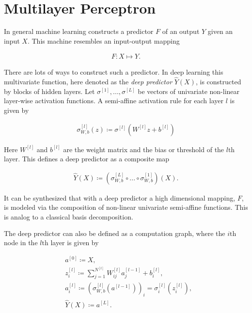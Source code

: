 \documentclass[12pt, a4paper]{thesis}
\begin{document}
\section{Multilayer Perceptron}
\label{sec:org1b5c208}

In general machine learning constructs a predictor \(F\) of an output
\(Y\) given an input \(X\). This machine resembles an input-output
mapping

\begin{align}
  F : X \mapsto Y.
\end{align}

There are lots of ways to construct such a predictor. In deep learning
this multivariate function, here denoted as the \emph{deep predictor}
\(\hat{Y}(X)\), is constructed by blocks of hidden layers. Let
\(\sigma^{[1]},...,\sigma^{[L]}\) be vectors of univariate non-linear
layer-wise activation functions. A semi-affine activation rule for
each layer $l$ is given by

\begin{align}
  \sigma^{[l]}_{W,b}(z) \coloneqq \sigma^{[l]}\left(W^{[l]} z + b^{[l]} \right)
\end{align}

Here \(W^{[l]}\) and \(b^{[l]}\) are the weight matrix and the bias or
threshold of the \(l\text{th}\) layer.  This defines a deep predictor
as a composite map

\begin{align}
  \hat{Y}(X) \coloneqq \left( \sigma^{[L]}_{W,b} \circ ... \circ \sigma^{[1]}_{W,b}  \right) (X).
\end{align}

It can be synthesized that with a deep predictor a high dimensional
mapping, \(F\), is modeled via the composition of non-linear
univariate semi-affine functions. This is analog to a classical basis
decomposition.

The deep predictor can also be defined as a computation graph, where
the \(i\text{th}\) node in the \(l\text{th}\) layer is given by

\begin{align}
  &a^{[0]} \coloneqq X, \\
  &z^{[l]}_{i} \coloneqq \sum_{j=1}^{N^{[l]}} W^{[l]}_{ij} a^{[l-1]}_{j} + b^{[l]}_{i}, \label{z-def}\\
  &a^{[l]}_{i} \coloneqq \left(\sigma^{[l]}_{W,b}(a^{[l-1]})\right)_{i} = \sigma^{[l]}_{i}(z^{[l]}_{i}), \label{forward}\\
  &\hat{Y}(X) \coloneqq a^{[L]}.
\end{align}
\end{document}
